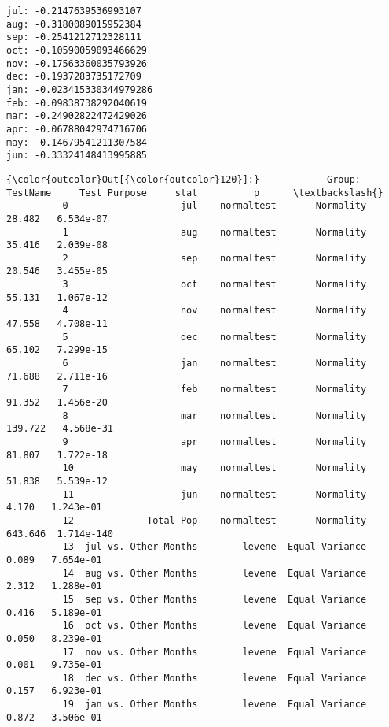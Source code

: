 \documentclass[11pt]{article}
\begin{document}
    \begin{Verbatim}[commandchars=\\\{\}]
jul: -0.2147639536993107
aug: -0.3180089015952384
sep: -0.2541212712328111
oct: -0.10590059093466629
nov: -0.17563360035793926
dec: -0.1937283735172709
jan: -0.023415330344979286
feb: -0.09838738292040619
mar: -0.24902822472429026
apr: -0.06788042974716706
may: -0.14679541211307584
jun: -0.33324148413995885

    \end{Verbatim}

\begin{Verbatim}[commandchars=\\\{\}]
{\color{outcolor}Out[{\color{outcolor}120}]:}            Group:           TestName     Test Purpose     stat          p      \textbackslash{}
          0                    jul    normaltest       Normality     28.482   6.534e-07   
          1                    aug    normaltest       Normality     35.416   2.039e-08   
          2                    sep    normaltest       Normality     20.546   3.455e-05   
          3                    oct    normaltest       Normality     55.131   1.067e-12   
          4                    nov    normaltest       Normality     47.558   4.708e-11   
          5                    dec    normaltest       Normality     65.102   7.299e-15   
          6                    jan    normaltest       Normality     71.688   2.711e-16   
          7                    feb    normaltest       Normality     91.352   1.456e-20   
          8                    mar    normaltest       Normality    139.722   4.568e-31   
          9                    apr    normaltest       Normality     81.807   1.722e-18   
          10                   may    normaltest       Normality     51.838   5.539e-12   
          11                   jun    normaltest       Normality      4.170   1.243e-01   
          12             Total Pop    normaltest       Normality    643.646  1.714e-140   
          13  jul vs. Other Months        levene  Equal Variance      0.089   7.654e-01   
          14  aug vs. Other Months        levene  Equal Variance      2.312   1.288e-01   
          15  sep vs. Other Months        levene  Equal Variance      0.416   5.189e-01   
          16  oct vs. Other Months        levene  Equal Variance      0.050   8.239e-01   
          17  nov vs. Other Months        levene  Equal Variance      0.001   9.735e-01   
          18  dec vs. Other Months        levene  Equal Variance      0.157   6.923e-01   
          19  jan vs. Other Months        levene  Equal Variance      0.872   3.506e-01   

\end{Verbatim}
\end{document}
